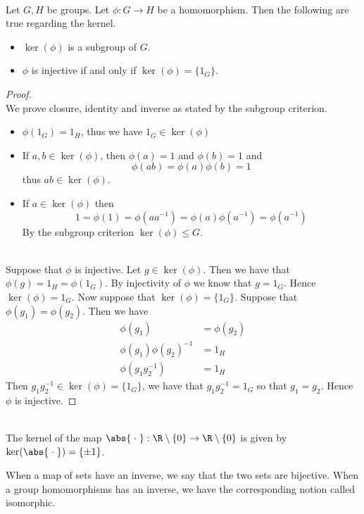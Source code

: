 \documentclass[a4paper]{article}
\begin{document}
\begin{lmm}{}{}\\
Let $G,H$ be groups. Let $\phi:G\to H$ be a homomorphism. Then the following are true regarding the kernel. 
\begin{itemize}
\item $\ker(\phi)$ is a subgroup of $G$. 
\item $\phi$ is injective if and only if $\ker(\phi)=\{1_G\}$. 
\end{itemize}
\begin{proof}\\
We prove closure, identity and inverse as stated by the subgroup criterion. 
\begin{itemize}
\item $\phi(1_G)=1_H$, thus we have $1_G\in\ker(\phi)$
\item If $a,b\in\ker(\phi)$, then $\phi(a)=1$ and $\phi(b)=1$ and $$\phi(ab)=\phi(a)\phi(b)=1$$ thus $ab\in\ker(\phi)$. 
\item If $a\in\ker(\phi)$ then $$1=\phi(1)=\phi(aa^{-1})=\phi(a)\phi(a^{-1})=\phi(a^{-1})$$ By the subgroup criterion $\ker(\phi)\leq G$. 
\end{itemize}~\\

Suppose that $\phi$ is injective. Let $g\in\ker(\phi)$. Then we have that $\phi(g)=1_H=\phi(1_G)$. By injectivity of $\phi$ we know that $g=1_G$. Hence $\ker(\phi)=1_G$. Now suppose that $\ker(\phi)=\{1_G\}$. Suppose that $\phi(g_1)=\phi(g_2)$. Then we have 
\begin{align*}
\phi(g_1)&=\phi(g_2)\\
\phi(g_1)\phi(g_2)^{-1}&=1_H\\
\phi(g_1g_2^{-1})&=1_H
\end{align*}
Then $g_1g_2^{-1}\in\ker(\phi)=\{1_G\}$, we have that $g_1g_2^{-1}=1_G$ so that $g_1=g_2$. Hence $\phi$ is injective. 
\end{proof}
\end{lmm}

\begin{eg}{}{}\\
The kernel of the map $\abs{\;\cdot\;}:\R\setminus\{0\}\to\R\setminus\{0\}$ is given by $\ker(\abs{\;\cdot\;})=\{\pm 1\}$. 
\end{eg}

When a map of sets have an inverse, we say that the two sets are bijective. When a group homomorphisms has an inverse, we have the corresponding notion called isomorphic. 
\end{document}
